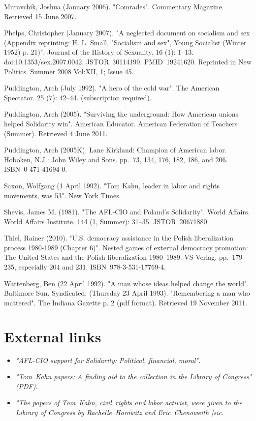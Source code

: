 Muravchik, Joshua (January 2006). "Comrades". Commentary Magazine.
Retrieved 15 June 2007.

Phelps, Christopher (January 2007). "A neglected document on socialism
and sex (Appendix reprinting: H. L. Small, "Socialism and sex", Young
Socialist (Winter 1952) p. 21)". Journal of the History of Sexuality. 16
(1): 1--13. doi:10.1353/sex.2007.0042. JSTOR~30114199. PMID~19241620.
Reprinted in New Politics. Summer 2008 Vol:XII, 1; Issue 45.

Puddington, Arch (July 1992). "A hero of the cold war". The American
Spectator. 25 (7): 42--44. (subscription required).

Puddington, Arch (2005). "Surviving the underground: How American unions
helped Solidarity win". American Educator. American Federation of
Teachers (Summer). Retrieved 4 June 2011.

Puddington, Arch (2005K). Lane Kirkland: Champion of American labor.
Hoboken, N.J.: John Wiley and Sons. pp.~73, 134, 176, 182, 186, and 206.
ISBN~0-471-41694-0.

Saxon, Wolfgang (1 April 1992). "Tom Kahn, leader in labor and rights
movements, was 53". New York Times.

Shevis, James M. (1981). "The AFL-CIO and Poland's Solidarity". World
Affairs. World Affairs Institute. 144 (1, Summer): 31--35.
JSTOR~20671880.

Thiel, Rainer (2010). "U.S. democracy assistance in the Polish
liberalization process 1980-1989 (Chapter 6)". Nested games of external
democracy promotion: The United States and the Polish liberalization
1980--1989. VS Verlag. pp.~179--235, especially 204 and 231.
ISBN~978-3-531-17769-4.

Wattenberg, Ben (22 April 1992). "A man whose ideas helped change the
world". Baltimore Sun. Syndicated: (Thursday 23 April 1993).
"Remembering a man who mattered". The Indiana Gazette p. 2 (pdf format).
Retrieved 19 November 2011.

\section{External links}\label{external-links}

\begin{itemize}
\item
  \emph{"AFL-CIO support for Solidarity: Political, financial, moral".}
\item
  \emph{"Tom~Kahn papers: A finding aid to the collection in the Library
  of Congress" (PDF).}
\item
  \emph{"The papers of Tom~Kahn, civil~rights and labor activist, were
  given to the Library of Congress by Rachelle~Horowitz and
  Eric~Chenoweith {[}sic.}
\end{itemize}

